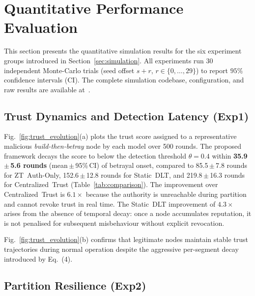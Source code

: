 
\section{Quantitative Performance Evaluation}
\label{sec:evaluation}

This section presents the quantitative simulation results for the six
experiment groups introduced in Section~\ref{sec:simulation}.  All
experiments run 30 independent Monte-Carlo trials (seed offset $s+r$,
$r\in\{0,\dots,29\}$) to report $95\%$ confidence intervals (CI).
The complete simulation codebase, configuration, and raw results are
available at~\cite{repo2026}.

\subsection{Trust Dynamics and Detection Latency (Exp1)}

Fig.~\ref{fig:trust_evolution}(a) plots the trust score assigned to
a representative malicious \emph{build-then-betray} node by each
model over 500 rounds.  The proposed framework decays the score to
below the detection threshold $\theta = 0.4$ within
\textbf{35.9\,$\pm$\,5.6 rounds} (mean\,$\pm$\,95\%\,CI) of betrayal
onset, compared to 85.5\,$\pm$\,7.8 rounds for ZT~Auth-Only,
152.6\,$\pm$\,12.8 rounds for Static~DLT, and 219.8\,$\pm$\,16.3
rounds for Centralized~Trust (Table~\ref{tab:comparison}).  The
improvement over Centralized~Trust is $6.1\times$ because the
authority is unreachable during partition and cannot revoke trust in
real time.  The Static~DLT improvement of $4.3\times$ arises from
the absence of temporal decay: once a node accumulates reputation, it
is not penalised for subsequent misbehaviour without explicit
revocation.

Fig.~\ref{fig:trust_evolution}(b) confirms that legitimate nodes
maintain stable trust trajectories during normal operation despite the
aggressive per-segment decay introduced by Eq.~(4).

\subsection{Partition Resilience (Exp2)}

